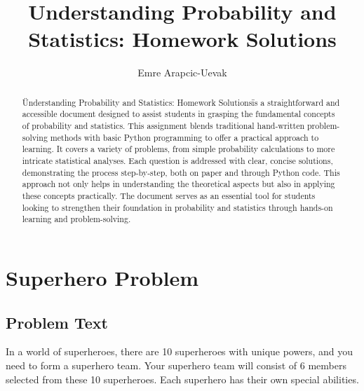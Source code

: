 \documentclass[a4paper, 10pt]{article}
\title{Understanding Probability and Statistics: Homework Solutions}
\author{Emre Arapcic-Uevak}
\date{}
\begin{document}
	\maketitle
	\vspace{5mm}
	
	\begin{abstract}
		\begin{center}
			\noindent \"Understanding Probability and Statistics: Homework Solutions\" is a straightforward and accessible document designed to assist students in grasping the fundamental concepts of probability and statistics. This assignment blends traditional hand-written problem-solving methods with basic Python programming to offer a practical approach to learning. It covers a variety of problems, from simple probability calculations to more intricate statistical analyses. Each question is addressed with clear, concise solutions, demonstrating the process step-by-step, both on paper and through Python code. This approach not only helps in understanding the theoretical aspects but also in applying these concepts practically. The document serves as an essential tool for students looking to strengthen their foundation in probability and statistics through hands-on learning and problem-solving.
		\end{center}
	\end{abstract}
	\pagebreak
	
	\tableofcontents
	\pagebreak

    \section{Superhero Problem}
        \subsection{Problem Text}
            \noindent In a world of superheroes, there are 10 superheroes with unique powers, and you need to form a superhero team. Your superhero team will consist of 6 members selected from these 10 superheroes. Each superhero has their own special abilities.
\end{document}
